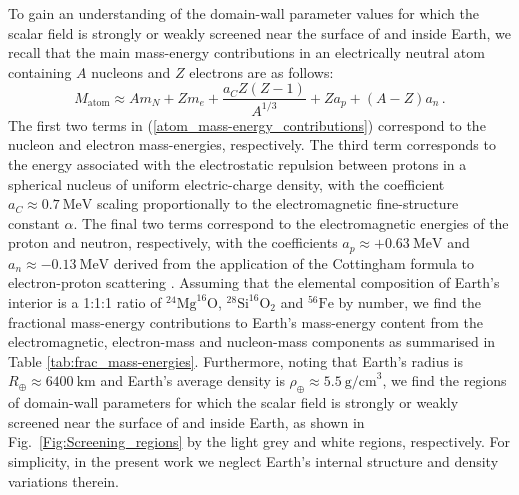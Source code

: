 \documentclass[aps,prd,onecolumn,nofootinbib]{revtex4-2} %
\begin{document}
To gain an understanding of the domain-wall parameter values for which the scalar field is strongly or weakly screened near the surface of and inside Earth, we recall that the main mass-energy contributions in an electrically neutral atom containing $A$ nucleons and $Z$ electrons are as follows: 
\begin{equation}
\label{atom_mass-energy_contributions}
M_\textrm{atom} \approx A m_N + Z m_e + \frac{a_C Z (Z-1)}{A^{1/3}} + Z a_p + (A-Z) a_n  \, . 
\end{equation}
The first two terms in (\ref{atom_mass-energy_contributions}) correspond to the nucleon and electron mass-energies, respectively. 
The third term corresponds to the energy associated with the electrostatic repulsion between protons in a spherical nucleus of uniform electric-charge density, with the coefficient $a_C \approx 0.7~\textrm{MeV}$ scaling proportionally to the electromagnetic fine-structure constant $\alpha$. 
The final two terms correspond to the electromagnetic energies of the proton and neutron, respectively, with the coefficients $a_p \approx +0.63~\textrm{MeV}$ and $a_n \approx -0.13~\textrm{MeV}$ derived from the application of the Cottingham formula \cite{Cottingham_1963} to electron-proton scattering \cite{Gasser-Leutwyler_1982}. 
Assuming that the elemental composition of Earth's interior is a 1:1:1 ratio of $^{24}\textrm{Mg}^{16}\textrm{O}$, $^{28}\textrm{Si}^{16}\textrm{O}_2$ and $^{56}\textrm{Fe}$ by number, we find the fractional mass-energy contributions to Earth's mass-energy content from the electromagnetic, electron-mass and nucleon-mass components as summarised in Table \ref{tab:frac_mass-energies}. 
Furthermore, noting that Earth's radius is $R_\oplus \approx 6400~\textrm{km}$ and Earth's average density is $\rho_\oplus \approx 5.5~\textrm{g/cm}^3$, we find the regions of domain-wall parameters for which the scalar field is strongly or weakly screened near the surface of and inside Earth, as shown in Fig.~\ref{Fig:Screening_regions} by the light grey and white regions, respectively. 
For simplicity, in the present work we neglect Earth's internal structure and density variations therein. 
\end{document}
